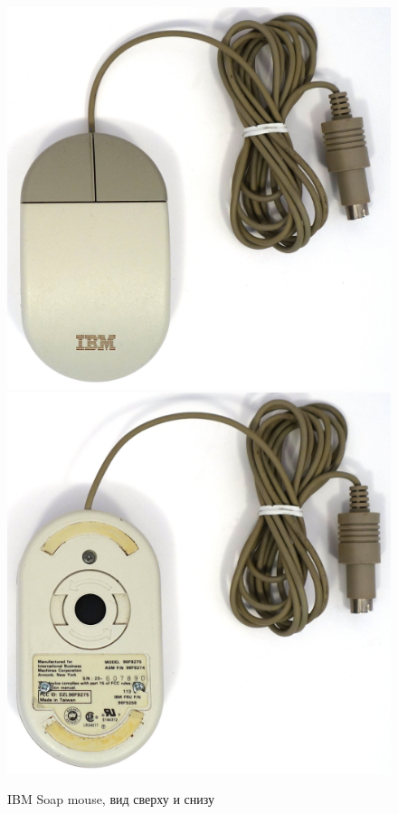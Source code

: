 \documentclass[11pt, a4paper]{article}
\begin{document}
\begin{figure}[h]
    \centering
    \includegraphics[scale=0.4]{1992_ibm_soap_mouse/top_60.jpg}
    \includegraphics[scale=0.4]{1992_ibm_soap_mouse/bottom_60.jpg}
    \caption{IBM Soap mouse, вид сверху и снизу}
    \label{fig:IBMSoapTopBottom}
\end{figure}
\end{document}
